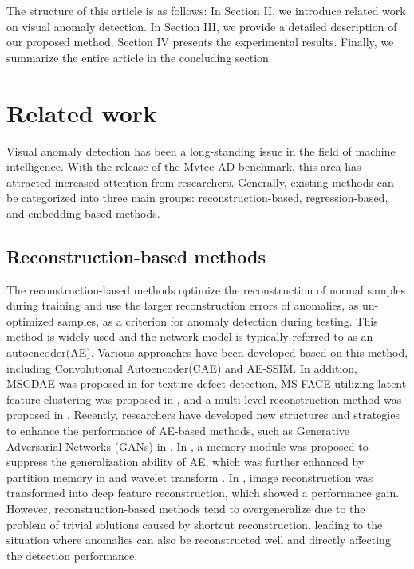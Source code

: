 \documentclass[lettersize,journal]{IEEEtran}
\begin{document}
The structure of this article is as follows: In Section II, we introduce related work on visual anomaly detection. In Section III, we provide a detailed description of our proposed method. Section IV presents the experimental results. Finally, we summarize the entire article in the concluding section.


\section{Related work}

Visual anomaly detection has been a long-standing issue in the field of machine intelligence. With the release of the Mvtec AD benchmark\cite{r28}, this area has attracted increased attention from researchers. Generally, existing methods can be categorized into three main groups: reconstruction-based, regression-based, and embedding-based methods.

\subsection{Reconstruction-based methods}

The reconstruction-based methods optimize the reconstruction of normal samples during training and use the larger reconstruction errors of anomalies, as un-optimized samples, as a criterion for anomaly detection during testing. This method is widely used and the network model is typically referred to as an autoencoder(AE)\cite{r1}. Various approaches have been developed based on this method, including Convolutional Autoencoder(CAE) and AE-SSIM\cite{r2}. In addition, MSCDAE was proposed in \cite{r3} for texture defect detection, MS-FACE utilizing latent feature clustering was proposed in \cite{r4}, and a multi-level reconstruction method was proposed in \cite{r5}. Recently, researchers have developed new structures and strategies to enhance the performance of AE-based methods, such as Generative Adversarial Networks (GANs) in \cite{r9}. In \cite{r6}, a memory module was proposed to suppress the generalization ability of AE, which was further enhanced by partition memory in \cite{r7} and wavelet transform \cite{r8}. In \cite{r10}, image reconstruction was transformed into deep feature reconstruction, which showed a performance gain. However, reconstruction-based methods tend to overgeneralize due to the problem of trivial solutions caused by shortcut reconstruction\cite{r6}, leading to the situation where anomalies can also be reconstructed well and directly affecting the detection performance.
\end{document}
